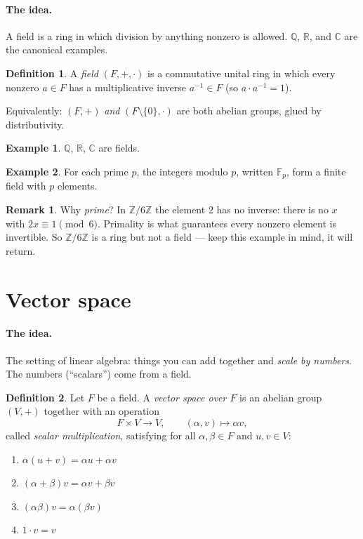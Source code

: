 \documentclass[11pt]{article}
\theoremstyle{definition}
\newtheorem*{defn}{Definition}
\newtheorem*{ex}{Example}
\newtheorem*{rem}{Remark}
\begin{document}
\paragraph{The idea.}
A field is a ring in which division by anything nonzero is allowed.
$\mathbb{Q}$, $\mathbb{R}$, and $\mathbb{C}$ are the canonical examples.

\begin{defn}
A \emph{field} $(F,+,\cdot)$ is a commutative unital ring in which every nonzero
$a\in F$ has a multiplicative inverse $a^{-1}\in F$ (so $a\cdot a^{-1} = 1$).
\end{defn}

\noindent Equivalently: $(F,+)$ \emph{and} $(F\setminus\{0\},\cdot)$ are both abelian
groups, glued by distributivity.

\begin{ex}
$\mathbb{Q}$, $\mathbb{R}$, $\mathbb{C}$ are fields.
\end{ex}

\begin{ex}
For each prime $p$, the integers modulo $p$, written $\mathbb{F}_p$, form a finite
field with $p$ elements.
\end{ex}

\begin{rem}
Why \emph{prime}? In $\mathbb{Z}/6\mathbb{Z}$ the element $2$ has no inverse: there is
no $x$ with $2x \equiv 1 \pmod 6$. Primality is what guarantees every nonzero element
is invertible. So $\mathbb{Z}/6\mathbb{Z}$ is a ring but not a field — keep this
example in mind, it will return.
\end{rem}

\section{Vector space}

\paragraph{The idea.}
The setting of linear algebra: things you can add together and \emph{scale by
numbers}. The numbers (``scalars'') come from a field.

\begin{defn}
Let $F$ be a field. A \emph{vector space over $F$} is an abelian group $(V,+)$
together with an operation
\[
F \times V \to V, \qquad (\alpha, v) \mapsto \alpha v,
\]
called \emph{scalar multiplication}, satisfying for all $\alpha,\beta\in F$ and $u,v\in V$:
\begin{enumerate}[label=(V\arabic*), leftmargin=3em]
  \item $\alpha(u+v) = \alpha u + \alpha v$
  \item $(\alpha+\beta) v = \alpha v + \beta v$
  \item $(\alpha\beta) v = \alpha(\beta v)$
  \item $1\cdot v = v$
\end{enumerate}
\end{defn}
\end{document}

